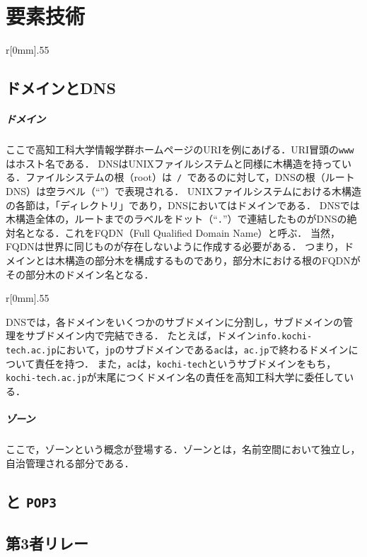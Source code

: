 \chapter{要素技術}
\newcommand{\popt}{\texttt{POP3}}
\begin{wrapfigure}{r}[0mm]{.55\textwidth}
    \centering
    
\end{wrapfigure}
\section{ドメインとDNS}\label{chap:DNS}
\paragraph{ドメイン}
ここで高知工科大学情報学群ホームページのURIを例にあげる．URI冒頭の\texttt{www}はホスト名である．
DNSはUNIXファイルシステムと同様に木構造を持っている．ファイルシステムの根（root）は\texttt{\ /\ }であるのに対して，DNSの根（ルートDNS）は空ラベル（``''）で表現される．
UNIXファイルシステムにおける木構造の各節は，「ディレクトリ」であり，DNSにおいてはドメインである．
DNSでは木構造全体の，ルートまでのラベルをドット（``\texttt{.}''）で連結したものがDNSの絶対名となる．これをFQDN（Full Qualified Domain Name）と呼ぶ．
当然，FQDNは世界に同じものが存在しないように作成する必要がある．
つまり，ドメインとは木構造の部分木を構成するものであり，部分木における根のFQDNがその部分木のドメイン名となる．

\begin{wrapfigure}{r}[0mm]{.55\textwidth}
    \centering
    
\end{wrapfigure}
DNSでは，各ドメインをいくつかのサブドメインに分割し，サブドメインの管理をサブドメイン内で完結できる．
たとえば，ドメイン\texttt{info.kochi-tech.ac.jp}において，\texttt{jp}のサブドメインである\texttt{ac}は，\texttt{ac.jp}で終わるドメインについて責任を持つ．
また，\texttt{ac}は，\texttt{kochi-tech}というサブドメインをもち，\texttt{kochi-tech.ac.jp}が末尾につくドメイン名の責任を高知工科大学に委任している．
\paragraph{ゾーン}ここで，ゾーンという概念が登場する．ゾーンとは，名前空間において独立し，自治管理される部分である．
\section{\smtp と \popt}\label{chap:smtppop}
\section{第3者リレー}